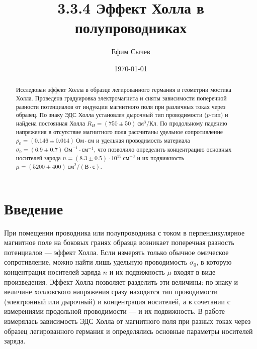 \documentclass[reprint, amsmath, amssymb, aps, pra, nofootinbib]{revtex4-2}
\begin{document}
\title{3.3.4 Эффект Холла в полупроводниках}

\author{Ефим Сычев}

\date{\today}

\begin{abstract}
Исследован эффект Холла в образце легированного германия в геометрии мостика Холла.
Проведена градуировка электромагнита и сняты зависимости поперечной разности потенциалов от индукции магнитного поля при различных токах через образец.
По знаку ЭДС Холла установлен дырочный тип проводимости ($p$-тип) и найдена постоянная Холла $R_H = (750 \pm 50)~\text{см}^3/\text{Кл}$.
По продольному падению напряжения в отсутствие магнитного поля рассчитаны удельное сопротивление $\rho_0 = (0.146 \pm 0.014)~\text{Ом}\cdot\text{см}$ и удельная проводимость материала $\sigma_0 = (6.9 \pm 0.7)~\text{Ом}^{-1}\cdot\text{см}^{-1}$, что позволило определить концентрацию основных носителей заряда $n = (8.3 \pm 0.5)\cdot 10^{15}~\text{см}^{-3}$ и их подвижность $\mu = (5200 \pm 400)~\text{см}^2/(\text{В}\cdot\text{с})$.
\end{abstract}

\maketitle

\section{Введение}
При помещении проводника или полупроводника с током в перпендикулярное магнитное поле на боковых гранях образца возникает поперечная разность потенциалов — эффект Холла.
Если измерять только обычное омическое сопротивление, можно найти лишь удельную проводимость $\sigma_0$, в которую концентрация носителей заряда $n$ и их подвижность $\mu$ входят в виде произведения.
Эффект Холла позволяет разделить эти величины: по знаку и величине холловского напряжения сразу находятся тип проводимости (электронный или дырочный) и концентрация носителей, а в сочетании с измерениями продольной проводимости — и их подвижность.
В работе измерялась зависимость ЭДС Холла от магнитного поля при разных токах через образец легированного германия и определялись основные параметры носителей заряда.
\end{document}
